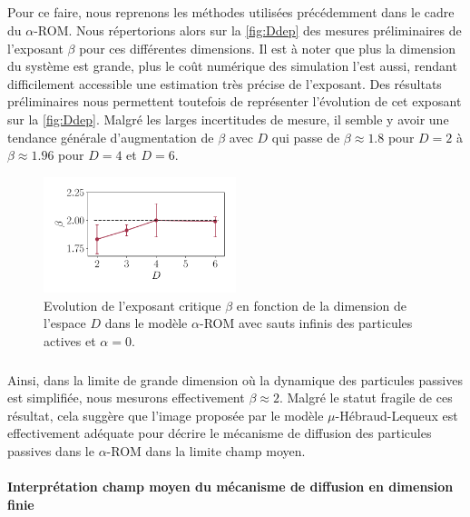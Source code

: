 \subparagraph{}Pour ce faire, nous reprenons les méthodes utilisées précédemment dans le cadre du $\alpha$-ROM. Nous répertorions alors sur la \autoref{fig:Ddep} des mesures préliminaires de l'exposant $\beta$ pour ces différentes dimensions. Il est à noter que plus la dimension du système est grande, plus le coût numérique des simulation l'est aussi, rendant difficilement accessible une estimation très précise de l'exposant. Des résultats préliminaires nous permettent toutefois de représenter l'évolution de cet exposant sur la \autoref{fig:Ddep}. Malgré les larges incertitudes de mesure, il semble y avoir une tendance générale d'augmentation de $\beta$ avec $D$ qui passe de $\beta \approx 1.8$ pour $D=2$ à $\beta \approx 1.96$ pour $D=4$ et $D=6$.

\begin{figure}[h]
	\centering
	\includegraphics[width=0.5\textwidth]{Chapitre3/Figures/Interpretation/D_dependence.pdf}
	\caption{Evolution de l'exposant critique $\beta$ en fonction de la dimension de l'espace $D$ dans le modèle $\alpha$-ROM avec sauts infinis des particules actives et $\alpha = 0$.}
	\label{fig:Ddep}
\end{figure}

\subparagraph{}Ainsi, dans la limite de grande dimension où la dynamique des particules passives est simplifiée, nous mesurons effectivement $\beta \approx 2$. Malgré le statut fragile de ces résultat, cela suggère que l'image proposée par le modèle $\mu$-Hébraud-Lequeux est effectivement adéquate pour décrire le mécanisme de diffusion des particules passives dans le $\alpha$-ROM dans la limite champ moyen.

\paragraph{Interprétation champ moyen du mécanisme de diffusion en dimension finie}

